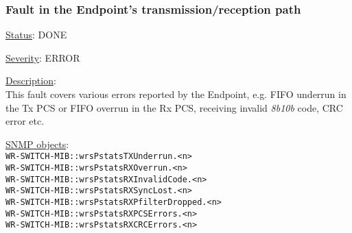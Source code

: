 \subsubsection{\bf Fault in the Endpoint's transmission/reception path}
		\label{fail:data:ep_txrx}
		\begin{packed_enum}
			\item [] \underline{Status}: DONE
			\item [] \underline{Severity}: ERROR
			\item [] \underline{Description}:\\
				This fault covers various errors reported by the Endpoint, e.g. FIFO
				underrun in the Tx PCS or FIFO overrun in the Rx PCS, receiving invalid
				\emph{8b10b} code, CRC error etc.
			\item [] \underline{SNMP objects}:\\
				\texttt{WR-SWITCH-MIB::wrsPstatsTXUnderrun.<n>}\\
				\texttt{WR-SWITCH-MIB::wrsPstatsRXOverrun.<n>}\\
				\texttt{WR-SWITCH-MIB::wrsPstatsRXInvalidCode.<n>}\\
				\texttt{WR-SWITCH-MIB::wrsPstatsRXSyncLost.<n>}\\
				\texttt{WR-SWITCH-MIB::wrsPstatsRXPfilterDropped.<n>}\\
				\texttt{WR-SWITCH-MIB::wrsPstatsRXPCSErrors.<n>}\\
				\texttt{WR-SWITCH-MIB::wrsPstatsRXCRCErrors.<n>}
		\end{packed_enum}

